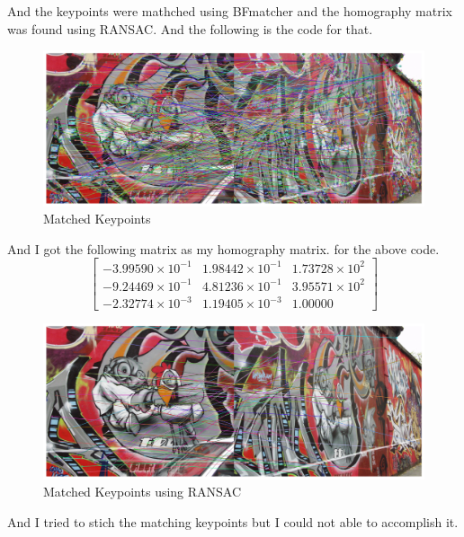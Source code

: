 \documentclass[11pt,a4paper]{article}
\begin{document}
And the keypoints were mathched using BFmatcher and the homography matrix was found using RANSAC. And the following is the code for that.

\lstset{style=mystyle}


{\begin{figure}[h]
    \centering
    \includegraphics[width=1.0\linewidth]{images/52.png}
    \caption{Matched Keypoints}
\end{figure}}

And I got the following matrix as my homography matrix. for the above code.
\[
\left[
\begin{array}{ccc}
    -3.99590 \times 10^{-1} & 1.98442 \times 10^{-1} & 1.73728 \times 10^{2} \\
    -9.24469 \times 10^{-1} & 4.81236 \times 10^{-1} & 3.95571 \times 10^{2} \\
    -2.32774 \times 10^{-3} & 1.19405 \times 10^{-3} & 1.00000
\end{array}
\right]
\]

\lstset{style=mystyle}


{\begin{figure}[h]
    \centering
    \includegraphics[width=1.0\linewidth]{images/53.png}
    \caption{Matched Keypoints using RANSAC}
\end{figure}}

And I tried to stich the matching keypoints but I could not able to accomplish it.
\end{document}
